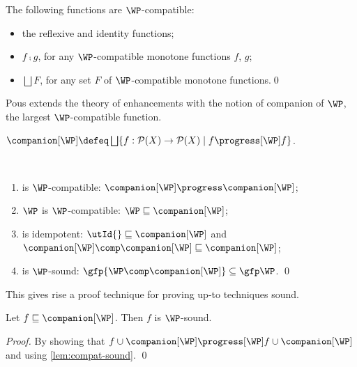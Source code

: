 \begin{lemma}\label{lem:pous-basic}
  The following functions are $\WP$-compatible:
  \begin{itemize}
    \item the reflexive \utRefl{} and identity \utId{} functions;
    \item $f \comp g$, for any $\WP$-compatible monotone functions $f$, $g$;
    \item $\bigsqcup F$, for any set $F$ of $\WP$-compatible monotone functions.\qed
    \end{itemize}
\end{lemma}

Pous \cite{PousCompanion} extends the theory of enhancements with the notion of companion of $\WP$, the largest 
 $\WP$-compatible function.
\begin{definition}[Companion]
  $\companion[\WP] \defeq \bigsqcup\{ f:\mathcal{P}(X)\to\mathcal{P}(X) \mid  {f\progress[\WP]f} \}$.
\end{definition}

\begin{lemma}\label{lem:companion-props}~
  \begin{enumerate}
    \item\label{lem:companion-props-1}
      \protect{\companion[\WP]} is $\WP$-compatible: $\companion[\WP]\progress\companion[\WP]$;
    \item\label{lem:companion-props-2}
      $\WP$ is $\WP$-compatible: $\WP\sqsubseteq\companion[\WP]$;
    \item\label{lem:companion-props-3}
      \protect{\companion[\WP]} is idempotent: ${\utId{}}\sqsubseteq\companion[\WP]$ and 
      $\companion[\WP]\comp\companion[\WP]\sqsubseteq\companion[\WP]$;
    \item\label{lem:companion-props-5}
      \companion[\WP] is $\WP$-sound: $\gfp{\WP\comp\companion[\WP]}\subseteq \gfp\WP$.
      \qed
  \end{enumerate}
\end{lemma}

This gives rise a proof technique for proving up-to techniques sound.
\begin{lemma}\label{lem:subseteq-companion-sound}
  Let $f\sqsubseteq\companion[\WP]$. Then $f$ is $\WP$-sound.
\end{lemma}
\begin{proof}
  By showing that $f\cup\companion[\WP]\progress[\WP]f\cup\companion[\WP]$ and using \cref{lem:compat-sound}.
\qed\end{proof}

